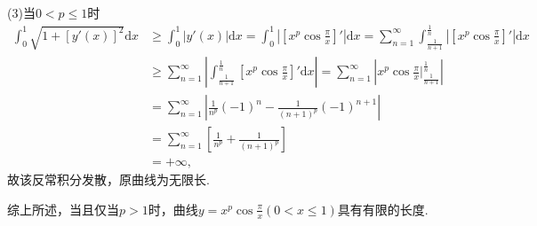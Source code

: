 \documentclass[12pt,UTF8]{ctexart}
\newcommand\Ser[1]{\sum_{n=#1}^\infty}
\begin{document}
\begin{enumerate}
(3)当$0<p\leq1$时
\[\begin{aligned}
\int_0^1\sqrt{1+[y'(x)]^2}\mathrm dx&\geq\int_0^1|y'(x)|\mathrm dx=\int_0^1|[x^p\cos\frac\pi x]'|\mathrm dx=\Ser1\int_{\frac1{n+1}}^{\frac1n}|[x^p\cos\frac\pi x]'|\mathrm dx\\
&\geq\Ser1|\int_{\frac1{n+1}}^{\frac1n}[x^p\cos\frac\pi x]'\mathrm dx|=\Ser1|x^p\cos\frac\pi x\big|_{\frac1{n+1}}^{\frac1n}|\\
&=\Ser1|\frac1{n^p}(-1)^n-\frac1{(n+1)^p}(-1)^{n+1}|\\
&=\Ser1[\frac1{n^p}+\frac1{(n+1)^p}]\\
&=+\infty,
\end{aligned}\]
故该反常积分发散，原曲线为无限长.

综上所述，当且仅当$p>1$时，曲线$y=x^p\cos\frac\pi x(0<x\leq1)$具有有限的长度.
\end{enumerate}
\end{document}
